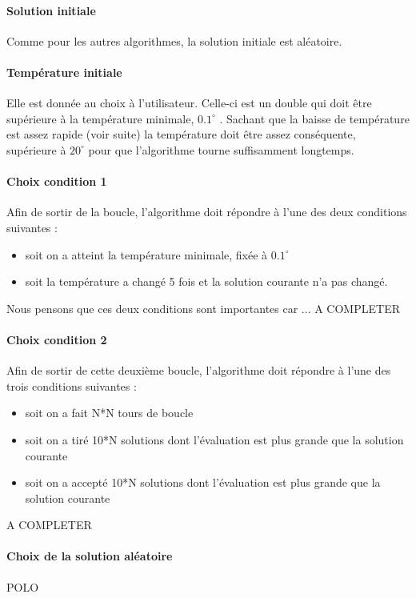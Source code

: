 \documentclass[12pt]{article}
\begin{document}
\paragraph{Solution initiale} Comme pour les autres algorithmes, la solution initiale est aléatoire.

\paragraph{Température initiale} Elle est donnée au choix à l’utilisateur. Celle-ci est un double qui doit être supérieure à la température minimale, $0.1^\circ$ . Sachant que la baisse de température est assez rapide (voir suite) la température doit être assez conséquente, supérieure à $20^\circ$ pour que l’algorithme tourne suffisamment longtemps.

\paragraph{Choix condition 1} Afin de sortir de la boucle, l’algorithme doit répondre à l’une des deux conditions suivantes :
	\begin{itemize}
    \item soit on a atteint la température minimale, fixée à $0.1^\circ$
    \item soit la température a changé 5 fois et la solution courante n’a pas changé.
    \end{itemize}

Nous pensons que ces deux conditions sont importantes car ... A COMPLETER

\paragraph{Choix condition 2} Afin de sortir de cette deuxième boucle, l’algorithme doit répondre à l’une des trois conditions suivantes :
	\begin{itemize}
	\item soit on a fait N*N tours de boucle
	\item soit on a tiré 10*N solutions dont l’évaluation est plus grande que la solution courante
	\item soit on a accepté 10*N solutions dont l’évaluation est plus grande que la solution courante
	\end{itemize}


A COMPLETER

\paragraph{Choix de la solution aléatoire} POLO
\end{document}
